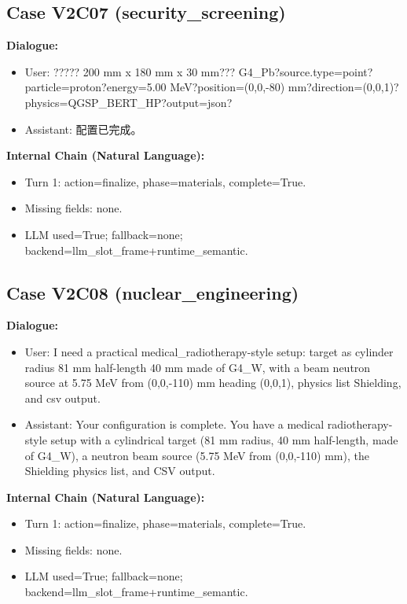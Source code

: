 \documentclass[11pt]{ctexart}
\begin{document}
\subsection{Case V2C07 (security\_screening)}
\textbf{Dialogue:}
\begin{itemize}
\item User: ????? 200 mm x 180 mm x 30 mm??? G4\_Pb?source.type=point?particle=proton?energy=5.00 MeV?position=(0,0,-80) mm?direction=(0,0,1)?physics=QGSP\_BERT\_HP?output=json?
\item Assistant: 配置已完成。
\end{itemize}
\textbf{Internal Chain (Natural Language):}
\begin{itemize}
\item Turn 1: action=finalize, phase=materials, complete=True.
\item Missing fields: none.
\item LLM used=True; fallback=none; backend=llm\_slot\_frame+runtime\_semantic.
\end{itemize}
\subsection{Case V2C08 (nuclear\_engineering)}
\textbf{Dialogue:}
\begin{itemize}
\item User: I need a practical medical\_radiotherapy-style setup: target as cylinder radius 81 mm half-length 40 mm made of G4\_W, with a beam neutron source at 5.75 MeV from (0,0,-110) mm heading (0,0,1), physics list Shielding, and csv output.
\item Assistant: Your configuration is complete. You have a medical radiotherapy-style setup with a cylindrical target (81 mm radius, 40 mm half-length, made of G4\_W), a neutron beam source (5.75 MeV from (0,0,-110) mm), the Shielding physics list, and CSV output.
\end{itemize}
\textbf{Internal Chain (Natural Language):}
\begin{itemize}
\item Turn 1: action=finalize, phase=materials, complete=True.
\item Missing fields: none.
\item LLM used=True; fallback=none; backend=llm\_slot\_frame+runtime\_semantic.
\end{itemize}
\end{document}
